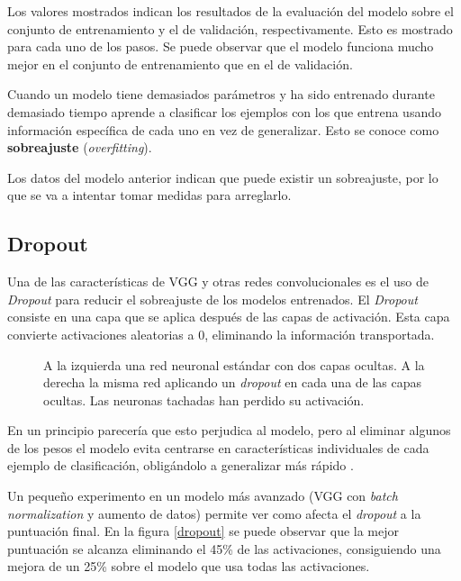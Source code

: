 Los valores mostrados indican los resultados de la evaluación del modelo sobre el conjunto de entrenamiento y el de validación, respectivamente. Esto es mostrado para cada uno de los pasos. Se puede observar que el modelo funciona mucho mejor en el conjunto de entrenamiento que en el de validación.

Cuando un modelo tiene demasiados parámetros y ha sido entrenado durante demasiado tiempo aprende a clasificar los ejemplos con los que entrena usando información específica de cada uno en vez de generalizar. Esto se conoce como \textbf{sobreajuste} (\textit{overfitting}).

Los datos del modelo anterior indican que puede existir un sobreajuste, por lo que se va a intentar tomar medidas para arreglarlo.

\subsection{Dropout}

Una de las características de VGG y otras redes convolucionales es el uso de \textit{Dropout} para reducir el sobreajuste de los modelos entrenados. El \textit{Dropout} consiste en una capa que se aplica después de las capas de activación. Esta capa convierte activaciones aleatorias a 0, eliminando la información transportada.

\begin{figure}
    \caption{A la izquierda una red neuronal estándar con dos capas ocultas. A la derecha la misma red aplicando un \textit{dropout} en cada una de las capas ocultas. Las neuronas tachadas han perdido su activación.}
\label{dropout-net}
\end{figure}



En un principio parecería que esto perjudica al modelo, pero al eliminar algunos de los pesos el modelo evita centrarse en características individuales de cada ejemplo de clasificación, obligándolo a generalizar más rápido \parencite{dropout}.

Un pequeño experimento en un modelo más avanzado (VGG con \textit{batch normalization} y aumento de datos) permite ver  como afecta el \textit{dropout} a la puntuación final. En la figura \ref{dropout} se puede observar que la mejor puntuación se alcanza eliminando el 45\% de las activaciones, consiguiendo una mejora de un 25\% sobre el modelo que usa todas las activaciones.

